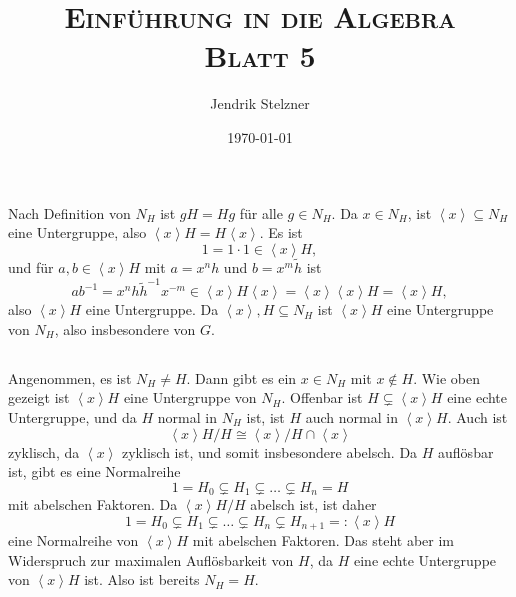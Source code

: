 \documentclass[a4paper,10pt]{article}
\title{\textsc{Einführung in die Algebra \\ \Large Blatt 5}}
\author{Jendrik Stelzner}
\date{\today}
\theoremstyle{definition}
\newcommand{\gen}[1]{\left\langle#1\right\rangle}
\begin{document}
\maketitle





\section{}


\subsection{}
Nach Definition von $N_H$ ist $gH = Hg$ für alle $g \in N_H$. Da $x \in N_H$, ist $\gen{x} \subseteq N_H$ eine Untergruppe, also $\gen{x}H = H\gen{x}$.
Es ist
\[
 1 = 1 \cdot 1 \in \gen{x}H,
\]
und für $a,b \in \gen{x}H$ mit $a = x^n h$ und $b = x^m \tilde{h}$ ist
\[
 ab^{-1} = x^n h \tilde{h}^{-1} x^{-m} \in \gen{x} H \gen{x} = \gen{x} \gen{x} H = \gen{x} H,
\]
also $\gen{x}H$ eine Untergruppe. Da $\gen{x}, H \subseteq N_H$ ist $\gen{x}H$ eine Untergruppe von $N_H$, also insbesondere von $G$.


\subsection{}
Angenommen, es ist $N_H \neq H$. Dann gibt es ein $x \in N_H$ mit $x \not\in H$. Wie oben gezeigt ist $\gen{x}H$ eine Untergruppe von $N_H$. Offenbar ist $H \subsetneq \gen{x}H$ eine echte Untergruppe, und da $H$ normal in $N_H$ ist, ist $H$ auch normal in $\gen{x}H$. Auch ist
\[
 \gen{x}\!H/H \cong \gen{x}/H \cap \gen{x}
\]
zyklisch, da $\gen{x}$ zyklisch ist, und somit insbesondere abelsch. Da $H$ auflösbar ist, gibt es eine Normalreihe
\[
 1 = H_0 \subsetneq H_1 \subsetneq \ldots \subsetneq H_n = H
\]
mit abelschen Faktoren. Da $\gen{x}H/H$ abelsch ist, ist daher
\[
 1 = H_0 \subsetneq H_1 \subsetneq \ldots \subsetneq H_n \subsetneq H_{n+1} =: \gen{x}H
\]
eine Normalreihe von $\gen{x}H$ mit abelschen Faktoren. Das steht aber im Widerspruch zur maximalen Auflösbarkeit von $H$, da $H$ eine echte Untergruppe von $\gen{x}H$ ist. Also ist bereits $N_H = H$.





\section{}
\end{document}
